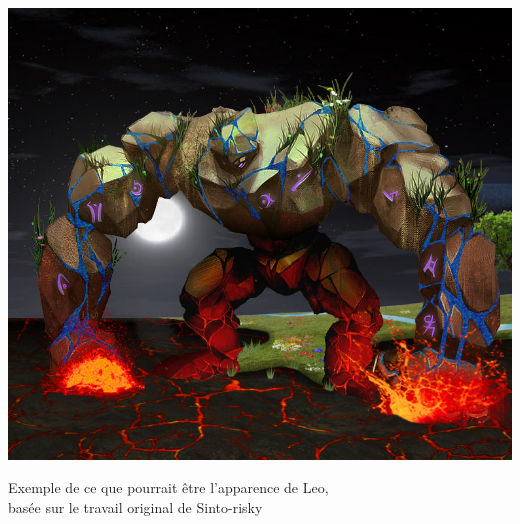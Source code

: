 \begin{figureWithNotes}[p]
	\center
	\captionsetup{format=myformat}
	\hspace*{-3.5cm}\includegraphics[width=\paperwidth-\myHorizontalTotalMargins]{images/Monde/Leo/Leo.png}
	\caption{Exemple de ce que pourrait être l'apparence de Leo,\\basée sur le travail original de Sinto-risky {\cite{StoneGolem_Sinto-risky}}}
\end{figureWithNotes}
